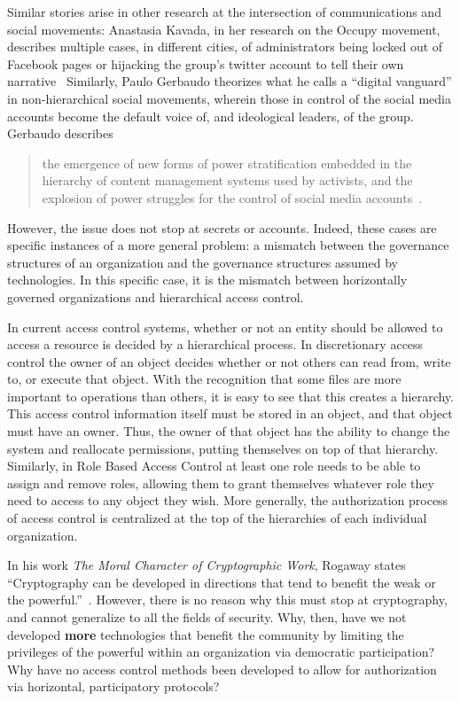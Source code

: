 Similar stories arise in other research at the intersection of communications
and social movements: Anastasia Kavada, in her research on the Occupy movement,
describes multiple cases, in different cities, of administrators being locked
out of Facebook pages or hijacking the group’s twitter account to tell their own
narrative~\cite{kavada2015creating} Similarly, Paulo Gerbaudo theorizes what he
calls a ``digital vanguard'' in non-hierarchical social movements, wherein those
in control of the social media accounts become the default voice of, and
ideological leaders, of the group. Gerbaudo describes 

\begin{quote}
the emergence of new forms of power stratification embedded in the hierarchy
of content management systems used by activists, and the explosion of power
struggles for the control of social media accounts~\cite{gerbaudo2017social}.
\end{quote}

However, the issue does not stop at secrets or accounts. Indeed, these cases are
specific instances of a more general problem: a mismatch between the governance
structures of an organization and the governance structures assumed by
technologies. In this specific case, it is the mismatch between horizontally
governed organizations and hierarchical access control.

In current access control systems, whether or not an entity should be allowed to
access a resource is decided by a hierarchical process. In discretionary access
control the owner of an object decides whether or not others can read from,
write to, or execute that object. With the recognition that some files are more
important to operations than others, it is easy to see that this creates a
hierarchy. This access control information itself must be stored in an object,
and that object must have an owner. Thus, the owner of that object has the
ability to change the system and reallocate permissions, putting themselves on
top of that hierarchy. Similarly, in Role Based Access Control at least one role
needs to be able to assign and remove roles, allowing them to grant themselves
whatever role they need to access to any object they wish. More generally, the
authorization process of access control is centralized at the top of the
hierarchies of each individual organization.

In his work \textit{The Moral Character of Cryptographic Work}, Rogaway states
``Cryptography can be developed in directions that tend to benefit the weak or
the powerful.''~\cite{rogaway2015moral}. However, there is no reason why this
must stop at cryptography, and cannot generalize to all the fields of security.
Why, then, have we not developed \textbf{more} technologies that benefit the
community by limiting the privileges of the powerful within an organization via
democratic participation? Why have no access control methods been developed to
allow for authorization via horizontal, participatory protocols?

